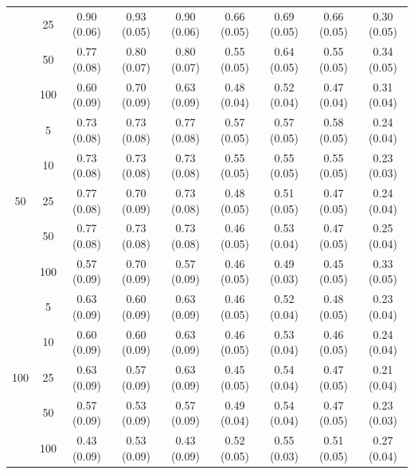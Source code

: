 \documentclass[11pt]{article}
\theoremstyle{definition}
\begin{document}
\begin{table}[H]
\begin{center}
\begin{tabular}{cc|ccc|cccc}
   & 25  & 0.90 (0.06) & 0.93 (0.05) & 0.90 (0.06) & 0.66 (0.05) & 0.69 (0.05) & 0.66 (0.05) & 0.30 (0.05) \\ 
    & 50  & 0.77 (0.08) & 0.80 (0.07) & 0.80 (0.07) & 0.55 (0.05) & 0.64 (0.05) & 0.55 (0.05) & 0.34 (0.05) \\ 
    & 100  & 0.60 (0.09) & 0.70 (0.09) & 0.63 (0.09) & 0.48 (0.04) & 0.52 (0.04) & 0.47 (0.04) & 0.31 (0.04) \\[.3cm] 
   \multirow{5}{*}{50}  & 5  & 0.73 (0.08) & 0.73 (0.08) & 0.77 (0.08) & 0.57 (0.05) & 0.57 (0.05) & 0.58 (0.05) & 0.24 (0.04) \\ 
    & 10  & 0.73 (0.08) & 0.73 (0.08) & 0.73 (0.08) & 0.55 (0.05) & 0.55 (0.05) & 0.55 (0.05) & 0.23 (0.03) \\ 
    & 25  & 0.77 (0.08) & 0.70 (0.09) & 0.73 (0.08) & 0.48 (0.05) & 0.51 (0.05) & 0.47 (0.05) & 0.24 (0.04) \\ 
    & 50  & 0.77 (0.08) & 0.73 (0.08) & 0.73 (0.08) & 0.46 (0.05) & 0.53 (0.04) & 0.47 (0.05) & 0.25 (0.04) \\ 
    & 100  & 0.57 (0.09) & 0.70 (0.09) & 0.57 (0.09) & 0.46 (0.05) & 0.49 (0.03) & 0.45 (0.05) & 0.33 (0.05) \\[.3cm] 
  \multirow{5}{*}{100}  & 5  & 0.63 (0.09) & 0.60 (0.09) & 0.63 (0.09) & 0.46 (0.05) & 0.52 (0.04) & 0.48 (0.05) & 0.23 (0.04) \\ 
    & 10  & 0.60 (0.09) & 0.60 (0.09) & 0.63 (0.09) & 0.46 (0.05) & 0.53 (0.04) & 0.46 (0.05) & 0.24 (0.04) \\ 
    & 25  & 0.63 (0.09) & 0.57 (0.09) & 0.63 (0.09) & 0.45 (0.05) & 0.54 (0.04) & 0.47 (0.05) & 0.21 (0.04) \\ 
    & 50  & 0.57 (0.09) & 0.53 (0.09) & 0.57 (0.09) & 0.49 (0.04) & 0.54 (0.04) & 0.47 (0.05) & 0.23 (0.03) \\ 
    & 100  & 0.43 (0.09) & 0.53 (0.09) & 0.43 (0.09) & 0.52 (0.05) & 0.55 (0.03) & 0.51 (0.05) & 0.27 (0.04) \\
\end{tabular}
   \end{center}
   \vspace{-.5cm}
\end{table}

\newpage




\end{document}

